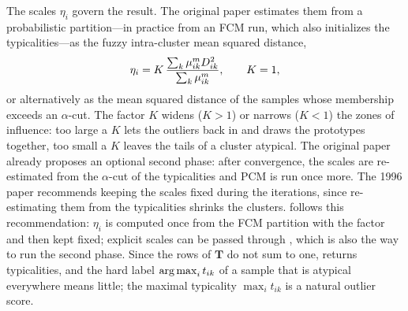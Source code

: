 The scales $\eta_i$ govern the result. The original paper estimates them from a probabilistic partition---in practice from an FCM run, which also initializes the typicalities---as the fuzzy intra-cluster mean squared distance,
\begin{equation}
  \eta_i=K\,\frac{\sum_k\mu_{ik}^mD^2_{ik}}{\sum_k\mu_{ik}^m},\qquad K=1,
  \label{eq:robust:eta}
\end{equation}
or alternatively as the mean squared distance of the samples whose membership exceeds an $\alpha$-cut. The factor $K$ widens ($K>1$) or narrows ($K<1$) the zones of influence: too large a $K$ lets the outliers back in and draws the prototypes together, too small a $K$ leaves the tails of a cluster atypical. The original paper already proposes an optional second phase: after convergence, the scales are re-estimated from the $\alpha$-cut of the typicalities and PCM is run once more. The 1996 paper recommends keeping the scales fixed during the iterations, since re-estimating them from the typicalities shrinks the clusters.  follows this recommendation: $\eta_i$ is computed once from the FCM partition with the factor  and then kept fixed; explicit scales can be passed through , which is also the way to run the second phase. Since the rows of $\mathbf{T}$ do not sum to one,  returns typicalities, and the hard label $\operatorname{arg\,max}_i t_{ik}$ of a sample that is atypical everywhere means little; the maximal typicality $\max_i t_{ik}$ is a natural outlier score.

